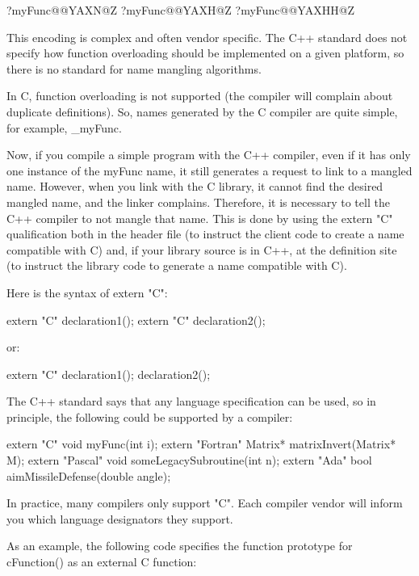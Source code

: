 \begin{shell}
?myFunc@@YAXN@Z
?myFunc@@YAXH@Z
?myFunc@@YAXHH@Z
\end{shell}

This encoding is complex and often vendor specific. The C++ standard does not specify how function overloading should be implemented on a given platform, so there is no standard for name mangling algorithms.

In C, function overloading is not supported (the compiler will complain about duplicate definitions). So, names generated by the C compiler are quite simple, for example, \_myFunc.

Now, if you compile a simple program with the C++ compiler, even if it has only one instance of the myFunc name, it still generates a request to link to a mangled name. However, when you link with the C library, it cannot find the desired mangled name, and the linker complains. Therefore, it is necessary to tell the C++ compiler to not mangle that name. This is done by using the extern "C" qualification both in the header file (to instruct the client code to create a name compatible with C) and, if your library source is in C++, at the definition site (to instruct the library code to generate a name compatible with C).

Here is the syntax of extern "C":

\begin{cpp}
extern "C" declaration1();
extern "C" declaration2();
\end{cpp}

or:

\begin{cpp}
extern "C" {
    declaration1();
    declaration2();
}
\end{cpp}

The C++ standard says that any language specification can be used, so in principle, the following could be supported by a compiler:

\begin{cpp}
extern "C" void myFunc(int i);
extern "Fortran" Matrix* matrixInvert(Matrix* M);
extern "Pascal" void someLegacySubroutine(int n);
extern "Ada" bool aimMissileDefense(double angle);
\end{cpp}

In practice, many compilers only support "C". Each compiler vendor will inform you which language designators they support.

As an example, the following code specifies the function prototype for cFunction() as an external C function:

